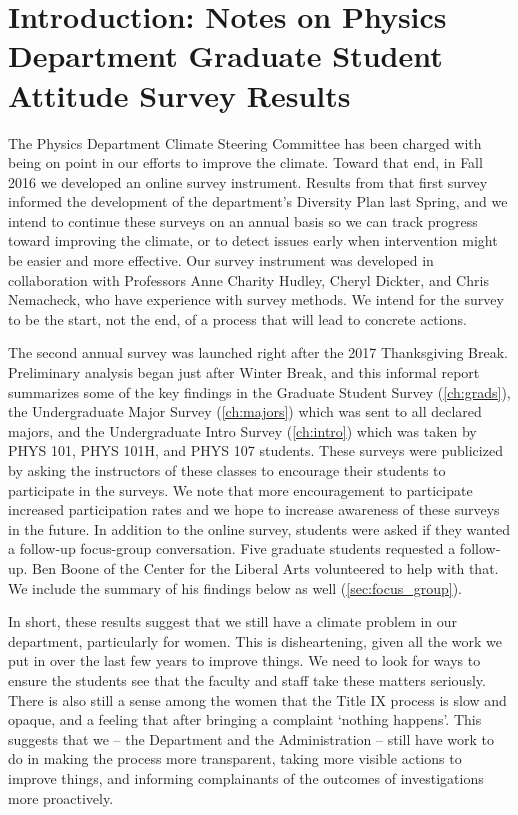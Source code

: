 \documentclass[oneside]{book}   %
\begin{document}
\tableofcontents
 
\mainmatter
 
\chapter{Introduction: Notes on Physics Department Graduate Student Attitude Survey Results}

The Physics Department Climate Steering Committee has been charged with being on point in our efforts to improve the climate. Toward that end, in Fall 2016 we developed an online survey instrument. Results from that first survey informed the development of the department’s Diversity Plan last Spring, and we intend to continue these surveys on an annual basis so we can track progress toward improving the climate, or to detect issues early when intervention might be easier and more effective. Our survey instrument was developed in collaboration with Professors Anne Charity Hudley, Cheryl Dickter, and Chris Nemacheck, who have experience with survey methods. We intend for the survey to be the start, not the end, of a process that will lead to concrete actions.


The second annual survey was launched right after the 2017 Thanksgiving Break. Preliminary analysis began just after Winter Break, and this informal report summarizes some of the key findings in the Graduate Student Survey (\cref{ch:grads}), the Undergraduate Major Survey (\cref{ch:majors}) which was sent to all declared majors, and the Undergraduate Intro Survey (\cref{ch:intro}) which was taken by PHYS 101, PHYS 101H, and PHYS 107 students. These surveys were publicized by asking the instructors of these classes to encourage their students to participate in the surveys. We note that more encouragement to participate increased participation rates and we hope to increase awareness of these surveys in the future. In addition to the online survey, students were asked if they wanted a follow-up focus-group conversation. Five graduate students requested a follow-up. Ben Boone of the Center for the Liberal Arts volunteered to help with that. We include the summary of his findings below as well (\cref{sec:focus_group}). 


In short, these results suggest that we still have a climate problem in our department, particularly for women. This is disheartening, given all the work we put in over the last few years to improve things. We need to look for ways to ensure the students see that the faculty and staff take these matters seriously. There is also still a sense among the women that the Title IX process is slow and opaque, and a feeling that after bringing a complaint ‘nothing happens’. This suggests that we – the Department and the Administration – still have work to do in making the process more transparent, taking more visible actions to improve things, and informing complainants of the outcomes of investigations more proactively. 
\end{document}
